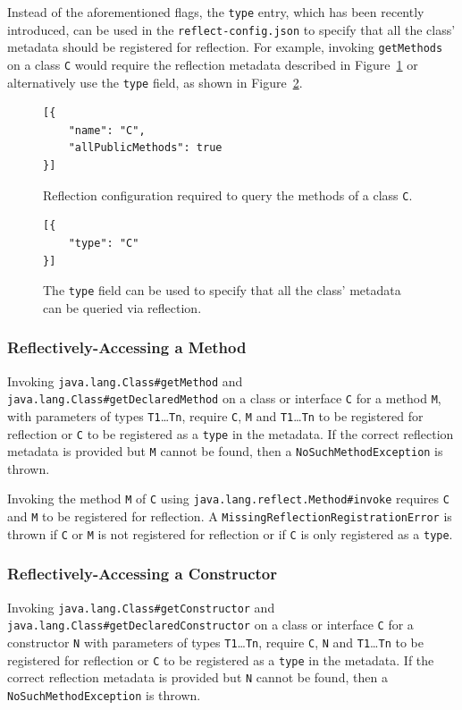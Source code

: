 Instead of the aforementioned flags, the \texttt{type} entry, which has been recently introduced, can be used in the \texttt{reflect-config.json} to specify that all the class' metadata should be registered for reflection.
For example, invoking \texttt{getMethods} on a class \verb|C| would require the reflection metadata described in Figure~\ref{fig:reflect_config_semantics} or alternatively use the \verb|type| field, as shown in Figure~\ref{fig:reflect_config_type}. 
\begin{figure}[ht]
    \centering
\begin{lstlisting}
[{
    "name": "C",
    "allPublicMethods": true
}]
\end{lstlisting}
    \caption{Reflection configuration required to query the methods of a class \texttt{C}.}
    \label{fig:reflect_config_semantics}
\end{figure}

\begin{figure}[ht]
    \centering
\begin{lstlisting}
[{
    "type": "C"
}]    
\end{lstlisting}
    \caption{The \texttt{type} field can be used to specify that all the class' metadata can be queried via reflection.}
    \label{fig:reflect_config_type}
\end{figure}

\subsubsection{Reflectively-Accessing a Method}
Invoking \texttt{java.lang.Class\#getMethod} and \texttt{java.lang.Class\#getDeclaredMethod} on a class or interface \verb|C| for a method \verb|M|, with parameters of types \verb|T1|\ldots\verb|Tn|, require \verb|C|, \verb|M| and \verb|T1|\ldots\verb|Tn| to be registered for reflection or \verb|C| to be registered as a \texttt{type} in the metadata. If the correct reflection metadata is provided but \verb|M| cannot be found, then a \texttt{NoSuchMethodException} is thrown. 

Invoking the method \verb|M| of \verb|C| using \texttt{java.lang.reflect.Method\#invoke} requires \verb|C| and \verb|M| to be registered for reflection. A \texttt{MissingReflectionRegistrationError} is thrown if \verb|C| or \verb|M| is not registered for reflection or if \verb|C| is only registered as a \texttt{type}.

\subsubsection{Reflectively-Accessing a Constructor}
Invoking \texttt{java.lang.Class\#getConstructor} and \texttt{java.lang.Class\#getDeclaredConstructor} on a class or interface \verb|C| for a constructor \verb|N| with parameters of types \verb|T1|\ldots\verb|Tn|, require \verb|C|, \verb|N| and \verb|T1|\ldots\verb|Tn| to be registered for reflection or \verb|C| to be registered as a \texttt{type} in the metadata. If the correct reflection metadata is provided but \verb|N| cannot be found, then a \texttt{NoSuchMethodException} is thrown.

